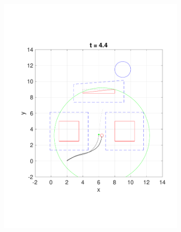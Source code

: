 \begin{figure}
\begin{subfigure}[t]{0.49\columnwidth}
    \includegraphics[width=\columnwidth]{fig/Q8D_Q4D/44}
  \end{subfigure}  
  

\end{figure}
